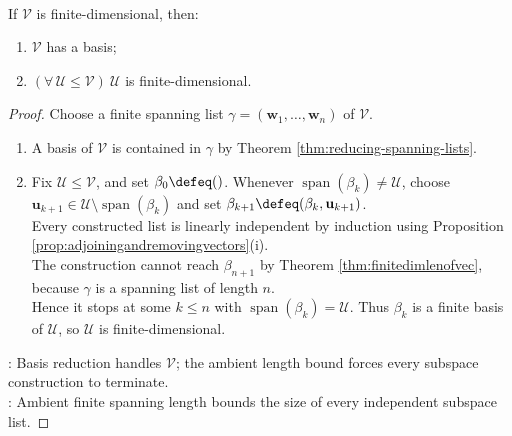 \begin{corollary} \label{cor:finite-dimensional-spaces-and-subspaces-have-bases} \\
If $\mathcal{V}$ is finite-dimensional, then:
\begin{enumerate}[label=(\roman*)]
\setlength{\itemsep}{0pt}
\item $\mathcal{V}$ has a basis;
\item $(\forall\,\mathcal{U}\leq\mathcal{V})\ \mathcal{U}$ is finite-dimensional.
\end{enumerate}
\begin{proof}
Choose a finite spanning list $\gamma=(\mathbf{w}_1,\ldots,\mathbf{w}_n)$ of $\mathcal{V}$.
\begin{enumerate}[label=(\roman*)]
\setlength{\itemsep}{0pt}
\item A basis of $\mathcal{V}$ is contained in $\gamma$ by Theorem \ref{thm:reducing-spanning-lists}.
\item Fix $\mathcal{U}\leq\mathcal{V}$, and set $\beta_0\defeq()$. Whenever $\operatorname{span}(\beta_k)\neq\mathcal{U}$, choose $\mathbf{u}_{k+1}\in\mathcal{U}\setminus\operatorname{span}(\beta_k)$ and set $\beta_{k+1}\defeq(\beta_k,\mathbf{u}_{k+1})$.\\
Every constructed list is linearly independent by induction using Proposition \ref{prop:adjoiningandremovingvectors}(i).\\
The construction cannot reach $\beta_{n+1}$ by Theorem \ref{thm:finitedimlenofvec}, because $\gamma$ is a spanning list of length $n$.\\Hence it stops at some $k\leq n$ with $\operatorname{span}(\beta_k)=\mathcal{U}$. Thus $\beta_k$ is a finite basis of $\mathcal{U}$, so $\mathcal{U}$ is finite-dimensional.
\end{enumerate}
: Basis reduction handles $\mathcal{V}$; the ambient length bound forces every subspace construction to terminate.\\
: Ambient finite spanning length bounds the size of every independent subspace list.
\end{proof}
\end{corollary}

